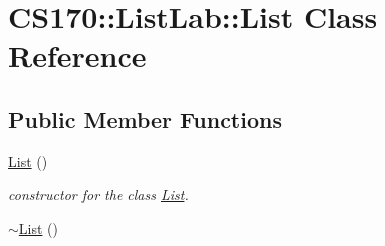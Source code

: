 \hypertarget{class_c_s170_1_1_list_lab_1_1_list}{\section{C\-S170\-:\-:List\-Lab\-:\-:List Class Reference}
\label{class_c_s170_1_1_list_lab_1_1_list}
}
\subsection*{Public Member Functions}
\begin{DoxyCompactItemize}
\item 
\hypertarget{class_c_s170_1_1_list_lab_1_1_list_a566a254e6b12cebbb651ad3f9b344c2d}{\hyperlink{class_c_s170_1_1_list_lab_1_1_list_a566a254e6b12cebbb651ad3f9b344c2d}{List} ()}\label{class_c_s170_1_1_list_lab_1_1_list_a566a254e6b12cebbb651ad3f9b344c2d}

\begin{DoxyCompactList}\small\item\em constructor for the class \hyperlink{class_c_s170_1_1_list_lab_1_1_list}{List}. \end{DoxyCompactList}\item 
\hypertarget{class_c_s170_1_1_list_lab_1_1_list_aae0901e613999c253b0bf05a619f32ad}{\hyperlink{class_c_s170_1_1_list_lab_1_1_list_aae0901e613999c253b0bf05a619f32ad}{$\sim$\-List} ()}\label{class_c_s170_1_1_list_lab_1_1_list_aae0901e613999c253b0bf05a619f32ad}


\end{DoxyCompactItemize}

